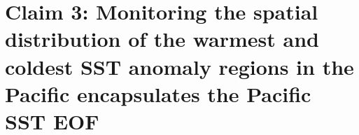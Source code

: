 \section{Claim 3: Monitoring the spatial distribution of the warmest and coldest SST anomaly regions in the Pacific encapsulates the Pacific SST EOF}